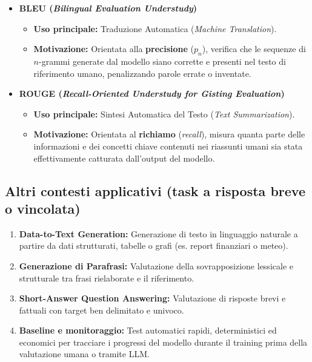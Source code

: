 \begin{itemize}
    \item \textbf{BLEU (\textit{Bilingual Evaluation Understudy})}
    \begin{itemize}
        \item \textbf{Uso principale:} Traduzione Automatica (\textit{Machine Translation}).
        \item \textbf{Motivazione:} Orientata alla \textbf{precisione} ($p_n$), verifica che le sequenze di $n$-grammi generate dal modello siano corrette e presenti nel testo di riferimento umano, penalizzando parole errate o inventate.
    \end{itemize}

    \item \textbf{ROUGE (\textit{Recall-Oriented Understudy for Gisting Evaluation})}
    \begin{itemize}
        \item \textbf{Uso principale:} Sintesi Automatica del Testo (\textit{Text Summarization}).
        \item \textbf{Motivazione:} Orientata al \textbf{richiamo} (\textit{recall}), misura quanta parte delle informazioni e dei concetti chiave contenuti nei riassunti umani sia stata effettivamente catturata dall'output del modello.
    \end{itemize}
\end{itemize}

\subsection*{Altri contesti applicativi (task a risposta breve o vincolata)}

\begin{enumerate}
    \item \textbf{Data-to-Text Generation:} Generazione di testo in linguaggio naturale a partire da dati strutturati, tabelle o grafi (es. report finanziari o meteo).
    \item \textbf{Generazione di Parafrasi:} Valutazione della sovrapposizione lessicale e strutturale tra frasi rielaborate e il riferimento.
    \item \textbf{Short-Answer Question Answering:} Valutazione di risposte brevi e fattuali con target ben delimitato e univoco.
    \item \textbf{Baseline e monitoraggio:} Test automatici rapidi, deterministici ed economici per tracciare i progressi del modello durante il training prima della valutazione umana o tramite LLM.
\end{enumerate}



